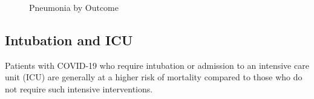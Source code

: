 \begin{figure}[H]%
    \caption{Pneumonia by Outcome}%
    \label{fig:pneumonia_insights_outcome}%
    \centering
    \qquad
    \qquad
\end{figure}

\subsection{Intubation and ICU}

Patients with COVID-19 who require intubation or admission to an intensive care unit
(ICU) are generally at a higher risk of mortality compared to those who do not
require such intensive interventions.

